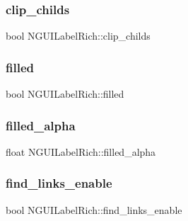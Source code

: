 \hypertarget{class_n_g_u_i_label_rich_abe7dc33547a5b188c46f0515728d8260}{}\label{class_n_g_u_i_label_rich_abe7dc33547a5b188c46f0515728d8260} 
\subsubsection{\texorpdfstring{clip\+\_\+childs}{clip\_childs}}
{\footnotesize\ttfamily bool N\+G\+U\+I\+Label\+Rich\+::clip\+\_\+childs}

\hypertarget{class_n_g_u_i_label_rich_aa91f0e34c57357e20a11dd128c22ced5}{}\label{class_n_g_u_i_label_rich_aa91f0e34c57357e20a11dd128c22ced5} 
\subsubsection{\texorpdfstring{filled}{filled}}
{\footnotesize\ttfamily bool N\+G\+U\+I\+Label\+Rich\+::filled}

\hypertarget{class_n_g_u_i_label_rich_aed5d0705fe2f6fba7d95336fe1c6f694}{}\label{class_n_g_u_i_label_rich_aed5d0705fe2f6fba7d95336fe1c6f694} 
\subsubsection{\texorpdfstring{filled\+\_\+alpha}{filled\_alpha}}
{\footnotesize\ttfamily float N\+G\+U\+I\+Label\+Rich\+::filled\+\_\+alpha}

\hypertarget{class_n_g_u_i_label_rich_a94575777eb161ed89e2596047932ba5b}{}\label{class_n_g_u_i_label_rich_a94575777eb161ed89e2596047932ba5b} 
\subsubsection{\texorpdfstring{find\+\_\+links\+\_\+enable}{find\_links\_enable}}
{\footnotesize\ttfamily bool N\+G\+U\+I\+Label\+Rich\+::find\+\_\+links\+\_\+enable}

